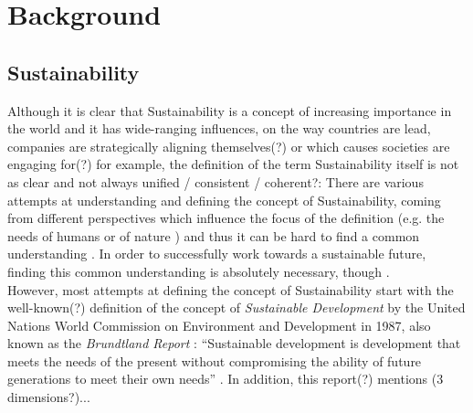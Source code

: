 \chapter{Background} %
\section{Sustainability}
Although it is clear that Sustainability is a concept of increasing importance in the world and it has wide-ranging influences, on the way countries are lead, companies are strategically aligning themselves(?) or which causes societies are engaging for(?) for example, the definition of the term Sustainability itself is not as clear and not always unified / consistent / coherent?: %
There are various attempts at understanding and defining the concept of Sustainability, coming from different perspectives which influence the focus of the definition (e.g. the needs of humans or of nature \cite{gladwin_shifting_1995}) and thus it can be hard to find a common understanding \cite{jamieson_sustainability_1998}%
. In order to successfully work towards a sustainable future, finding this common understanding is absolutely necessary, though \cite{jamieson_sustainability_1998}.\\

However, most attempts at defining the concept of Sustainability start with the well-known(?) definition of the concept of \textit{Sustainable Development} by the United Nations World Commission on Environment and Development in 1987, also known as the \textit{Brundtland Report} %
: "`Sustainable development is development that meets the needs of the present without compromising the ability of future generations to meet their own needs"'\cite{Brundtland1987} %
. In addition, this report(?) mentions (3 dimensions?)...

